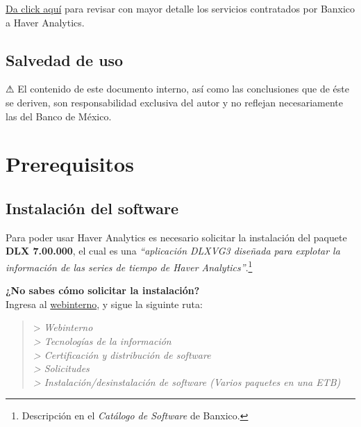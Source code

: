 \documentclass[
]{book}
\begin{document}
\href{http://webinterno/centro-de-informacion-electronica/acceso-a-recursos-electronicos/bases-de-datos-con-informacion-estadistica/haver-analytics-global/haver-analytics-global--.html}{Da click aquí} para revisar con mayor detalle los servicios contratados por Banxico a Haver Analytics.

\hypertarget{salvedad-de-uso}{%
\section{Salvedad de uso}\label{salvedad-de-uso}}

⚠ El contenido de este documento interno, así como las conclusiones que de éste se deriven, son responsabilidad exclusiva del autor y no reflejan necesariamente las del Banco de México.

\hypertarget{prereq}{%
\chapter{Prerequisitos}\label{prereq}}

\hypertarget{instalaciuxf3n-del-software}{%
\section{Instalación del software}\label{instalaciuxf3n-del-software}}

Para poder usar Haver Analytics es necesario solicitar la instalación del paquete \textbf{DLX 7.00.000}, el cual es una \emph{``aplicación DLXVG3 diseñada para explotar la información de las series de tiempo de Haver Analytics''}.\footnote{Descripción en el \emph{Catálogo de Software} de Banxico.}

\textbf{¿No sabes cómo solicitar la instalación?}\\
Ingresa al \href{http://webinterno}{webinterno}, y sigue la siguinte ruta:

\begin{quote}
\textgreater{} \emph{Webinterno\\
\hspace*{0.333em}\textgreater{} Tecnologías de la información\\
\hspace*{0.333em}\hspace*{0.333em}\textgreater{} Certificación y distribución de software\\
\hspace*{0.333em}\hspace*{0.333em}\hspace*{0.333em} \textgreater{} Solicitudes\\
\hspace*{0.333em}\hspace*{0.333em}\hspace*{0.333em}\hspace*{0.333em} \textgreater{} Instalación/desinstalación de software (Varios paquetes en una ETB)}
\end{quote}
\end{document}
